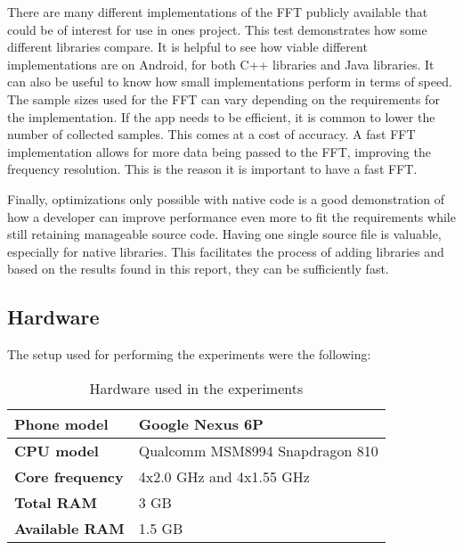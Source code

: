There are many different implementations of the FFT publicly available that could be of interest for use in ones project. This test demonstrates how some different libraries compare. It is helpful to see how viable different implementations are on Android, for both C++ libraries and Java libraries. It can also be useful to know how small implementations perform in terms of speed. The sample sizes used for the FFT can vary depending on the requirements for the implementation. If the app needs to be efficient, it is common to lower the number of collected samples. This comes at a cost of accuracy. A fast FFT implementation allows for more data being passed to the FFT, improving the frequency resolution.
This is the reason it is important to have a fast FFT.


Finally, optimizations only possible with native code is a good demonstration of how a developer can improve performance even more to fit the requirements while still retaining manageable source code. Having one single source file is valuable, especially for native libraries. This facilitates the process of adding libraries and based on the results found in this report, they can be sufficiently fast.

\subsection{Hardware}
The setup used for performing the experiments were the following:

\begin{table}[H]
    \centering
    \label{tab:hardware}
    \caption{Hardware used in the experiments}
    \begin{tabular}{|l|l|}
        \hline
        \textbf{Phone model} & Google Nexus 6P\\
        \hline
        \textbf{CPU model} & Qualcomm MSM8994 Snapdragon 810\\
        \hline
        \textbf{Core frequency} & 4x2.0 GHz and 4x1.55 GHz\\
        \hline
        \textbf{Total RAM} & 3 GB\\
        \hline
        \textbf{Available RAM} & 1.5 GB\\
        \hline
    \end{tabular}
\end{table}

